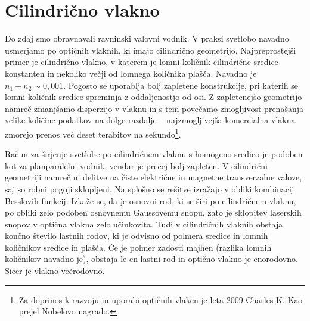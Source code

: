 \section{Cilindrično vlakno}
\label{chap:Cilinder}
Do zdaj smo obravnavali ravninski valovni vodnik. V praksi svetlobo
navadno usmerjamo po optičnih vlaknih, ki imajo cilindrično geometrijo.
Najpreprostejši primer je cilindrično vlakno, v katerem je lomni količnik cilindrične
sredice konstanten in nekoliko večji od lomnega količnika plašča. Navadno je 
$n_1 - n_2 \sim 0,001$. Pogosto se uporablja
bolj zapletene konstrukcije, pri katerih se lomni količnik sredice spreminja z
oddaljenostjo od osi. Z zapletenejšo geometrijo namreč zmanjšamo disperzijo v vlaknu in s tem
povečamo zmogljivost prenašanja velike količine podatkov na dolge razdalje -- 
najzmogljivejša komercialna vlakna zmorejo prenos več deset terabitov na 
sekundo\footnote{Za doprinos k razvoju in uporabi optičnih vlaken je leta 2009 Charles
K. Kao prejel Nobelovo nagrado.}.

Račun za širjenje svetlobe po cilindričnem vlaknu s homogeno sredico
je podoben kot za planparalelni vodnik, vendar je precej bolj
zapleten. V cilindrični geometriji namreč ni delitve na čiste električne in 
magnetne transverzalne valove, saj so robni pogoji sklopljeni. Na splošno se rešitve izražajo 
v obliki kombinacij Besslovih funkcij. Izkaže se, da je osnovni rod, ki se  širi po
cilindričnem vlaknu, po obliki zelo podoben osnovnemu Gaussovemu snopu, zato je sklopitev
laserskih snopov v optična vlakna zelo učinkovita. Tudi v cilindričnih vlaknih 
obstaja končno število lastnih rodov, ki je odvisno od polmera sredice in
lomnih količnikov sredice in plašča. Če je polmer zadosti majhen (razlika lomnih
količnikov navadno je), obstaja le en lastni rod in optično vlakno je 
enorodovno. Sicer je vlakno večrodovno.


